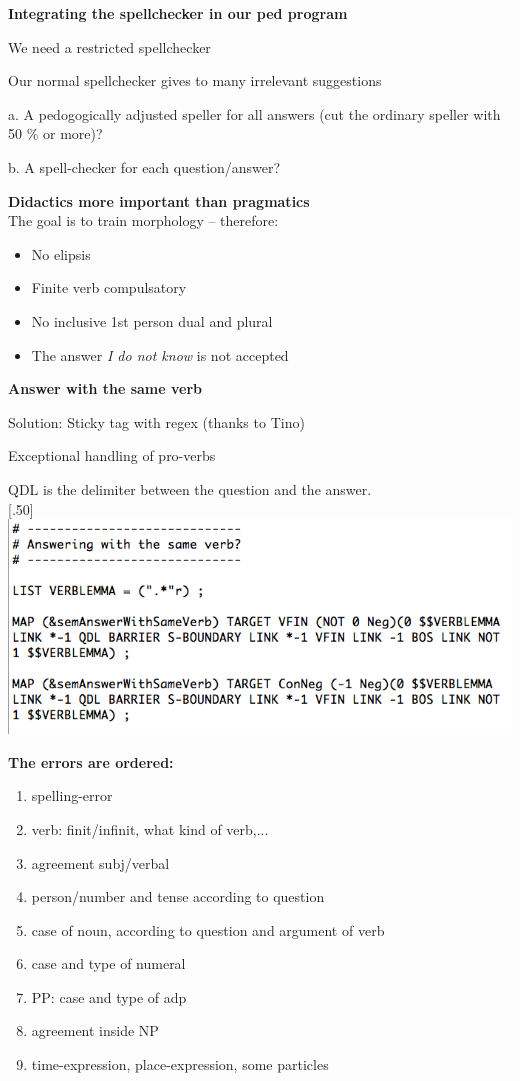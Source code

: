 \documentclass[landscape,norsk,11pt]{seminar}
\begin{document}
\begin{slide}
\newslide
\textbf{Integrating the spellchecker in our ped program}

We need a restricted spellchecker

Our normal spellchecker gives to many irrelevant suggestions

a. A pedogogically adjusted speller for all answers (cut the ordinary speller with 50 \% or more)?

b. A spell-checker for each question/answer?



\newslide
\textbf{Didactics more important than pragmatics} \\
The goal is to train morphology -- therefore:
\begin{itemize}
\item{No elipsis							  }
\item{Finite verb compulsatory}
\item{No inclusive 1st person dual and plural}
\item{The answer \textit{I do not know} is not accepted}
\end{itemize}


\newslide
\textbf{Answer with the same verb}

Solution: Sticky tag with regex (thanks to Tino)

Exceptional handling of pro-verbs 

\newslide
QDL is the delimiter between the question and the answer. \\
\newline
\scalebox{.50}[.50]{\includegraphics{img/answering_same_verb.png}}


\newslide

\textbf{The errors are ordered:}
\begin{enumerate}
\item spelling-error
\item verb: finit/infinit, what kind of verb,...
\item agreement subj/verbal
\item person/number and tense according to question
\item case of noun, according to question and argument of verb 
\item case and type of numeral
\item PP: case and type of adp
\item agreement inside NP
\item time-expression, place-expression, some particles
\end{enumerate}



\end{slide}
\end{document}
